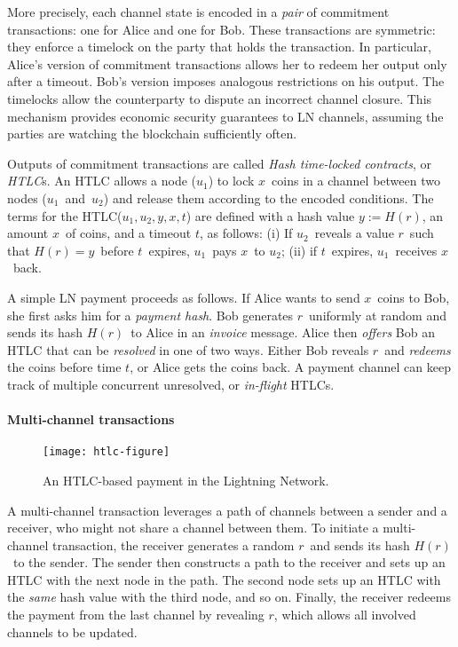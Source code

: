 More precisely, each channel state is encoded in a \textit{pair} of commitment transactions: one for Alice and one for Bob.
These transactions are symmetric: they enforce a timelock on the party that holds the transaction.
In particular, Alice's version of commitment transactions allows her to redeem her output only after a timeout.
Bob's version imposes analogous restrictions on his output.
The timelocks allow the counterparty to dispute an incorrect channel closure.
This mechanism provides economic security guarantees to LN channels, assuming the parties are watching the blockchain sufficiently often.

Outputs of commitment transactions are called \textit{Hash time-locked contracts}, or \textit{HTLC}s.
An HTLC allows a node ($u_1$) to lock $x$~coins in a channel between two nodes ($u_1$~and~$u_2$) and release them according to the encoded conditions.
The terms for the HTLC($u_1, u_2, y, x, t$) are defined with a hash value $y := H(r)$, an amount $x$~of coins, and a timeout $t$, as follows: 
(i) If $u_2$~reveals a value $r$~such that $H(r) = y$~before $t$~expires, $u_1$~pays $x$~to $u_2$; 
(ii) if $t$~expires, $u_1$~receives $x$~back.

A simple LN payment proceeds as follows.
If Alice wants to send $x$~coins to Bob, she first asks him for a \textit{payment hash}.
Bob generates $r$~uniformly at random and sends its hash $H(r)$~to Alice in an \textit{invoice} message.
Alice then \textit{offers} Bob an HTLC that can be \textit{resolved} in one of two ways.
Either Bob reveals $r$~and \textit{redeems} the coins before time $t$, or Alice gets the coins back.
A payment channel can keep track of multiple concurrent unresolved, or \textit{in-flight} HTLCs.


\paragraph{Multi-channel transactions}

\begin{figure*}
	\texttt{[image: htlc-figure]}
	\caption{An HTLC-based payment in the Lightning Network.}
	\label{fig:htlc}
\end{figure*}

A multi-channel transaction leverages a path of channels between a sender and a receiver, who might not share a channel between them.
To initiate a multi-channel transaction, the receiver generates a random $r$~and sends its hash $H(r)$~to the sender.
The sender then constructs a path to the receiver and sets up an HTLC with the next node in the path.
The second node sets up an HTLC with the \textit{same} hash value with the third node, and so on.
Finally, the receiver redeems the payment from the last channel by revealing $r$, which allows all involved channels to be updated.

